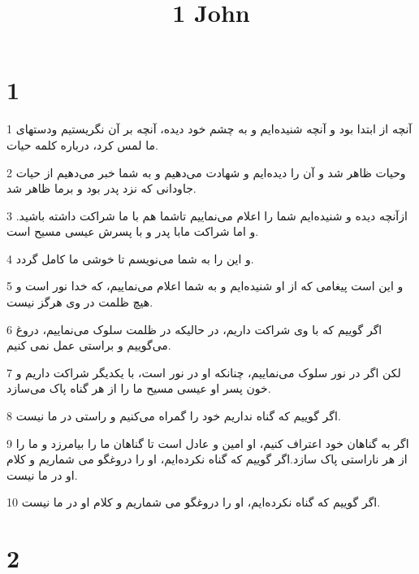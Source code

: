 

\title{1 John}


\chapter{1}

\par 1 آنچه از ابتدا بود و آنچه شنیده‌ایم و به چشم خود دیده، آنچه بر آن نگریستیم ودستهای ما لمس کرد، درباره کلمه حیات.
\par 2 وحیات ظاهر شد و آن را دیده‌ایم و شهادت می‌دهیم و به شما خبر می‌دهیم از حیات جاودانی که نزد پدر بود و برما ظاهر شد.
\par 3 ازآنچه دیده و شنیده‌ایم شما را اعلام می‌نماییم تاشما هم با ما شراکت داشته باشید. و اما شراکت مابا پدر و با پسرش عیسی مسیح است.
\par 4 و این را به شما می‌نویسم تا خوشی ما کامل گردد.
\par 5 و این است پیغامی که از او شنیده‌ایم و به شما اعلام می‌نماییم، که خدا نور است و هیچ ظلمت در وی هرگز نیست.
\par 6 اگر گوییم که با وی شراکت داریم، در حالیکه در ظلمت سلوک می‌نماییم، دروغ می‌گوییم و براستی عمل نمی کنیم.
\par 7 لکن اگر در نور سلوک می‌نماییم، چنانکه او در نور است، با یکدیگر شراکت داریم و خون پسر او عیسی مسیح ما را از هر گناه پاک می‌سازد.
\par 8 اگر گوییم که گناه نداریم خود را گمراه می‌کنیم و راستی در ما نیست.
\par 9 اگر به گناهان خود اعتراف کنیم، او امین و عادل است تا گناهان ما را بیامرزد و ما را از هر ناراستی پاک سازد.اگر گوییم که گناه نکرده‌ایم، او را دروغگو می شماریم و کلام او در ما نیست.
\par 10 اگر گوییم که گناه نکرده‌ایم، او را دروغگو می شماریم و کلام او در ما نیست.

\chapter{2}

